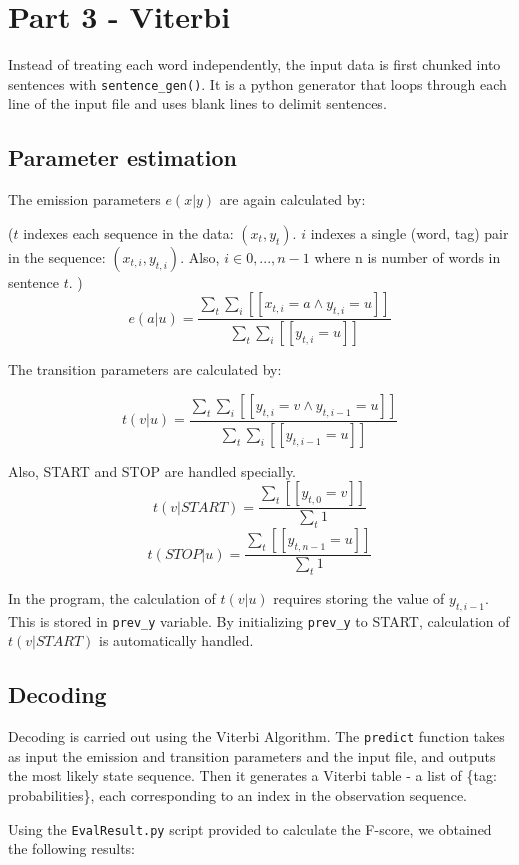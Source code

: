 \documentclass[12pt]{article}
\begin{document}
\pagebreak

\section{Part 3 - Viterbi}

Instead of treating each word independently, the input data is first chunked into sentences with \verb|sentence_gen()|. It is a python generator that loops through each line of the input file and uses blank lines to delimit sentences.

\subsection{Parameter estimation}

The emission parameters \(e(x|y)\) are again calculated by:

(\(t\) indexes each sequence in the data: \((x_t, y_t)\). \(i\) indexes a single (word, tag) pair in the sequence: \((x_{t,i}, y_{t,i})\). Also, \(i \in {0,...,n-1}\) where n is number of words in sentence \(t\). )
\[ e(a|u) = \frac{\sum_t \sum_i [[x_{t,i}=a \land y_{t,i}=u]] }{\sum_{t} \sum_i [[y_{t,i}=u]] } \]

The transition parameters are calculated by:

\[ t(v|u) = \frac{\sum_t \sum_i [[y_{t,i}=v \land y_{t,i-1}=u]] }{\sum_{t} \sum_i [[y_{t,i-1}=u]] } \]

Also, START and STOP are handled specially.
\[ t(v|START) = \frac{\sum_t [[y_{t,0}=v]] }{\sum_{t} 1 } \]
\[ t(STOP|u) = \frac{\sum_t [[y_{t,n-1}=u]] }{\sum_{t} 1 } \]

In the program, the calculation of \(t(v|u)\) requires storing the value of \(y_{t,i-1}\). This is stored in \verb|prev_y| variable. By initializing \verb|prev_y| to START, calculation of \(t(v|START)\) is automatically handled.

\subsection{Decoding}

Decoding is carried out using the Viterbi Algorithm.
The \texttt{predict} function takes as input the emission and transition parameters and the input file, and outputs the most likely state sequence.
Then it generates a Viterbi table - a list of \{tag: probabilities\}, each corresponding to an index in the observation sequence.


Using the \texttt{EvalResult.py} script provided to calculate the F-score, we obtained the following results:
\end{document}
